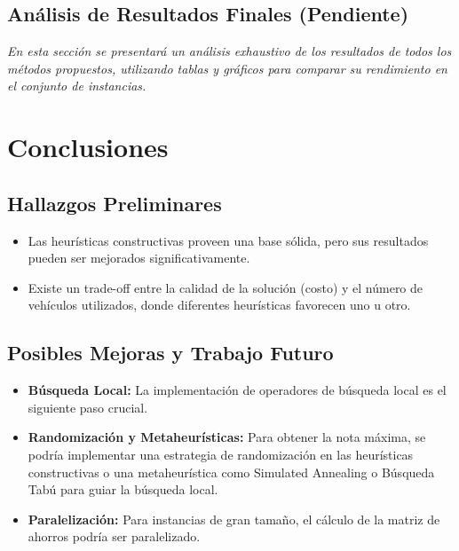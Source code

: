 \documentclass[a4paper,12pt]{article}
\begin{document}
\subsection{Análisis de Resultados Finales (Pendiente)}
\textit{En esta sección se presentará un análisis exhaustivo de los resultados de todos los métodos propuestos, utilizando tablas y gráficos para comparar su rendimiento en el conjunto de instancias.}

\section{Conclusiones}

\subsection{Hallazgos Preliminares}
\begin{itemize}
    \item Las heurísticas constructivas proveen una base sólida, pero sus resultados pueden ser mejorados significativamente.
    \item Existe un trade-off entre la calidad de la solución (costo) y el número de vehículos utilizados, donde diferentes heurísticas favorecen uno u otro.
\end{itemize}

\subsection{Posibles Mejoras y Trabajo Futuro}
\begin{itemize}
    \item \textbf{Búsqueda Local:} La implementación de operadores de búsqueda local es el siguiente paso crucial.
    \item \textbf{Randomización y Metaheurísticas:} Para obtener la nota máxima, se podría implementar una estrategia de randomización en las heurísticas constructivas o una metaheurística como Simulated Annealing o Búsqueda Tabú para guiar la búsqueda local.
    \item \textbf{Paralelización:} Para instancias de gran tamaño, el cálculo de la matriz de ahorros podría ser paralelizado.
\end{itemize}
\end{document}
